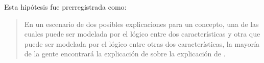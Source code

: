 \begin{hyp}
Esta hipótesis fue prerregistrada como:
\begin{quote}
En un escenario de dos posibles explicaciones para un concepto, una de las cuales puede ser modelada por el \AND lógico entre dos características y otra que puede ser modelada por el \OR lógico entre otras dos características, la mayoría de la gente encontrará la explicación de \AND sobre la explicación de \OR.
\end{quote}
\end{hyp}

